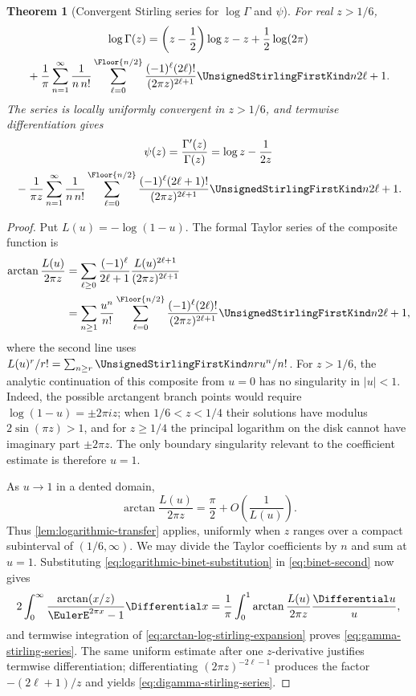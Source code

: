 \documentclass[11pt,a4paper,oneside,openany]{book}
\newtheorem{theorem}{Theorem}[chapter]
\theoremstyle{definition}
\theoremstyle{remark}
\begin{document}
\begin{theorem}[Convergent Stirling series for $\log\Gamma$ and $\psi$]
\label{thm:gamma-stirling-series}
For real $z>1/6$,
\begin{multline}
\label{eq:gamma-stirling-series}
 \log\Gamma(z)
 =\left(z-\frac12\right)\log z-z+\frac12\log(2\pi)\\
 {}+\frac1\pi\sum_{n=1}^{\infty}\frac1{n\,n!}
 \sum_{\ell=0}^{\Floor{n/2}}
 \frac{(-1)^\ell(2\ell)!}{(2\pi z)^{2\ell+1}}
 \UnsignedStirlingFirstKind n{2\ell+1}.
\end{multline}
The series is locally uniformly convergent in $z>1/6$, and termwise
differentiation gives
\begin{multline}
\label{eq:digamma-stirling-series}
 \psi(z)=\frac{\Gamma'(z)}{\Gamma(z)}
 =\log z-\frac1{2z}\\
 {}-\frac1{\pi z}\sum_{n=1}^{\infty}\frac1{n\,n!}
 \sum_{\ell=0}^{\Floor{n/2}}
 \frac{(-1)^\ell(2\ell+1)!}{(2\pi z)^{2\ell+1}}
 \UnsignedStirlingFirstKind n{2\ell+1}.
\end{multline}
\end{theorem}
\begin{proof}
Put $L(u)=-\log(1-u)$.  The formal Taylor series of the composite function is
\begin{align}
 \arctan\frac{L(u)}{2\pi z}
 &=\sum_{\ell\ge0}\frac{(-1)^\ell}{2\ell+1}
   \frac{L(u)^{2\ell+1}}{(2\pi z)^{2\ell+1}}\notag\\
 &=\sum_{n\ge1}\frac{u^n}{n!}
   \sum_{\ell=0}^{\Floor{n/2}}
   \frac{(-1)^\ell(2\ell)!}{(2\pi z)^{2\ell+1}}
   \UnsignedStirlingFirstKind n{2\ell+1},
 \label{eq:arctan-log-stirling-expansion}
\end{align}
where the second line uses
$L(u)^r/r!=\sum_{n\ge r}\UnsignedStirlingFirstKind nr u^n/n!$.
For $z>1/6$, the analytic continuation of this composite from $u=0$ has no
singularity in $|u|<1$.  Indeed, the possible arctangent branch points would
require $\log(1-u)=\pm2\pi iz$; when $1/6<z<1/4$ their solutions have modulus
$2\sin(\pi z)>1$, and for $z\ge1/4$ the principal logarithm on the disk cannot
have imaginary part $\pm2\pi z$.  The only boundary singularity relevant to the
coefficient estimate is therefore $u=1$.

As $u\to1$ in a dented domain,
\[
 \arctan\frac{L(u)}{2\pi z}
 =\frac\pi2+O\!\left(\frac1{L(u)}\right).
\]
Thus \cref{lem:logarithmic-transfer} applies, uniformly when $z$ ranges over a
compact subinterval of $(1/6,\infty)$.  We may divide the Taylor coefficients by
$n$ and sum at $u=1$.  Substituting \eqref{eq:logarithmic-binet-substitution} in
\eqref{eq:binet-second} now gives
\[
 2\int_0^\infty\frac{\arctan(x/z)}{\EulerE^{2\pi x}-1}\Differential x
 =\frac1\pi\int_0^1\arctan\frac{L(u)}{2\pi z}\frac{\Differential u}{u},
\]
and termwise integration of
\eqref{eq:arctan-log-stirling-expansion} proves
\eqref{eq:gamma-stirling-series}.  The same uniform estimate after one
$z$-derivative justifies termwise differentiation; differentiating
$(2\pi z)^{-2\ell-1}$ produces the factor $-(2\ell+1)/z$ and yields
\eqref{eq:digamma-stirling-series}.
\end{proof}
\end{document}
